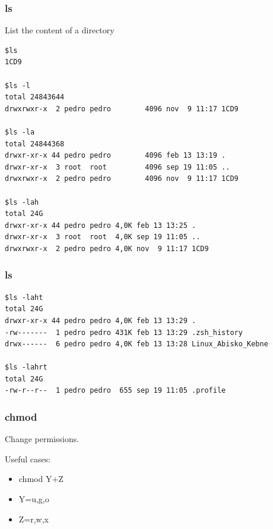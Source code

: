\begin{frame}[fragile]
	\frametitle{ls}
List the content of a directory
{\scriptsize
	\begin{verbatim}
$ls
1CD9

$ls -l
total 24843644
drwxrwxr-x  2 pedro pedro        4096 nov  9 11:17 1CD9

$ls -la
total 24844368
drwxr-xr-x 44 pedro pedro        4096 feb 13 13:19 .
drwxr-xr-x  3 root  root         4096 sep 19 11:05 ..
drwxrwxr-x  2 pedro pedro        4096 nov  9 11:17 1CD9

$ls -lah
total 24G
drwxr-xr-x 44 pedro pedro 4,0K feb 13 13:25 .
drwxr-xr-x  3 root  root  4,0K sep 19 11:05 ..
drwxrwxr-x  2 pedro pedro 4,0K nov  9 11:17 1CD9
	\end{verbatim}
}

\end{frame}
\begin{frame}[fragile]
	\frametitle{ ls}
{\scriptsize
	\begin{verbatim}
$ls -laht
total 24G
drwxr-xr-x 44 pedro pedro 4,0K feb 13 13:29 .
-rw-------  1 pedro pedro 431K feb 13 13:29 .zsh_history
drwx------  6 pedro pedro 4,0K feb 13 13:28 Linux_Abisko_Kebne

$ls -lahrt
total 24G
-rw-r--r--  1 pedro pedro  655 sep 19 11:05 .profile
	\end{verbatim}
}

\end{frame}
\begin{frame}[fragile]
	\frametitle{ chmod}
Change permissions.

Useful cases:
	\begin{itemize}
        \item chmod Y+Z 
        \item Y=u,g,o 
        \item Z=r,w,x
	\end{itemize}
        
\end{frame}

